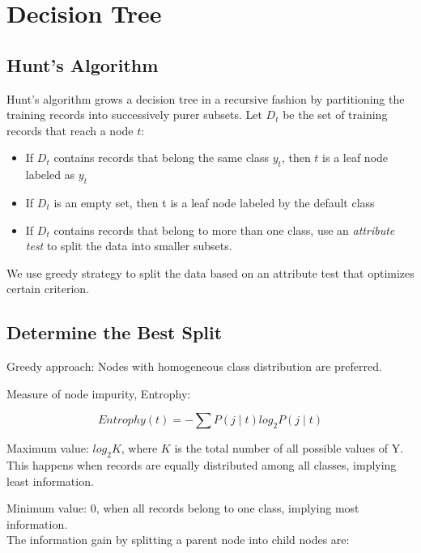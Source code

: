 \chapter{Decision Tree}

\begin{multicols*}{2}
\section{Hunt's Algorithm}

\noindent Hunt's algorithm grows a decision tree in a recursive fashion by partitioning the training records into successively purer subsets. Let $D_t$ be the set of training records that reach a node $t$:

\begin{itemize}
    \item If $D_t$ contains records that belong the same class $y_t$, then $t$ is a leaf node labeled as $y_t$
    \item If $D_t$ is an empty set, then t is a leaf node labeled by the default class
    \item If $D_t$ contains records that belong to more than one class, use an \textit{attribute test} to split the data into smaller subsets.
\end{itemize}

\noindent We use greedy strategy to split the data based on an attribute test that optimizes certain criterion. 

\section{Determine the Best Split}

\noindent Greedy approach: Nodes with homogeneous class distribution are preferred.

\noindent Measure of node impurity, Entrophy:

$$Entrophy(t)=-\sum P(j \mid t) log_2 P(j \mid t)$$ 

\noindent Maximum value: $log_{2} K$, where $K$ is the total number of all possible values of Y. This happens when records are equally distributed among all classes, implying least information. 

\noindent Minimum value: 0, when all records belong to one class, implying most information. \\

\noindent The information gain by splitting a parent node into child nodes are:


\end{multicols*}
